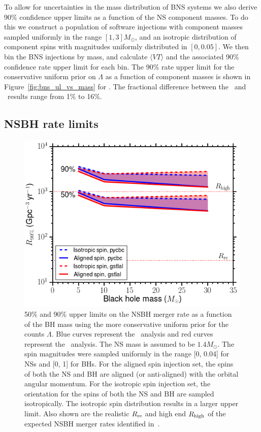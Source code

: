 To allow for uncertainties in the mass distribution of \ac{BNS} systems we also
derive 90\% confidence upper limits as a function of the \ac{NS} component masses.
To do this we construct a population of software injections with component masses
sampled uniformly in the range $[1, 3]M_{\odot}$, and an isotropic distribution
of component spins with magnitudes uniformly distributed in $[0, 0.05]$. We then bin
the \ac{BNS} injections by mass, and calculate $\langle VT \rangle$ and the associated 90\%
confidence rate upper limit for each bin. The 90\% rate upper limit for the conservative
uniform prior on $\Lambda$ as a function of component masses is shown in 
Figure~\ref{fig:bns_ul_vs_mass} for \pycbc. The fractional difference between the \pycbc\
and \gstlal\ results range from 1\% to 16\%.

\subsection{NSBH rate limits}
\label{ssec:nsbh_rate_limits}

\begin{figure}[t]
\centering
\includegraphics[width=1.0\textwidth]{figs/chapter3/figure5.png}
\caption{\label{fig:nsbh_ul_vs_mass} 50\% and 90\% upper limits on the \ac{NSBH} merger rate
as a function of the \ac{BH} mass using the more conservative uniform prior for the counts $\Lambda$. 
Blue curves represent the \pycbc\ analysis and red curves
represent the \gstlal\ analysis. The \ac{NS} mass is assumed to be $1.4M_\odot$. The spin magnitudes
were sampled uniformly in the range [0, 0.04] for \acp{NS} and [0, 1] for \acp{BH}. For the aligned
spin injection set, the spins of both the \ac{NS} and \ac{BH} are aligned (or anti-aligned) with the
orbital angular momentum. For the isotropic spin injection set, the orientation for the
spins of both the \ac{NS} and \ac{BH} are sampled isotropically. The isotropic spin distribution results
in a larger upper limit. Also shown are the realistic $R_{\rm re}$ and high end
$R_{\rm high}$ of the expected \ac{NSBH} merger rates identified in~\citep{Abadie:2010cf}.}
\end{figure}

